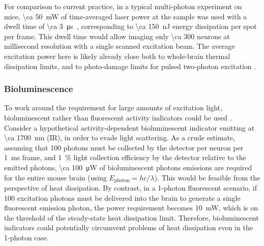 For comparison to current practice, in a typical multi-photon experiment on mice, \SI{\ca 50}{\milli\watt} of time-averaged laser power at the sample was used with a dwell time of \SI{\ca 3}{\micro\second}~\cite{wilson07}, corresponding to \SI{\ca 150}{\nano\joule} energy dissipation per spot per frame. This dwell time would allow imaging only \num{\ca 300} neurons at millisecond resolution with a single scanned excitation beam. The average excitation power here is likely already close both to whole-brain thermal dissipation limits, and to photo-damage limits for pulsed two-photon excitation \cite{hopt2001highly,konig1997cellular}.

\subsubsection{Bioluminescence}
To work around the requirement for large amounts of excitation light, bioluminescent rather than fluorescent activity indicators could be used \cite{naumann2010monitoring, martin2007vivo, martin2008vivo}.
Consider a hypothetical activity-dependent bioluminescent indicator emitting at \SI{\ca 1700}{\nano\meter} (IR), in order to evade light scattering.
As a crude estimate, assuming that 100 photons must be collected by the detector per neuron per \SI{1}{\milli\second} frame, and \SI{1}{\percent} light collection efficiency by the detector relative to the emitted photons, \SI{\ca 100}{\micro\watt} of bioluminescent photons emissions are required for the entire mouse brain (using $E_{\text{photon}} = hc/\lambda$).
This would be feasible from the perspective of heat dissipation.
By contrast, in a 1-photon fluorescent scenario, if 100 excitation photons must be delivered into the brain to generate a single fluorescent emission photon, the power requirement becomes \SI{10}{\milli\watt}, which is on the threshold of the steady-state heat dissipation limit.
Therefore, bioluminescent indicators could potentially circumvent problems of heat dissipation even in the 1-photon case.


